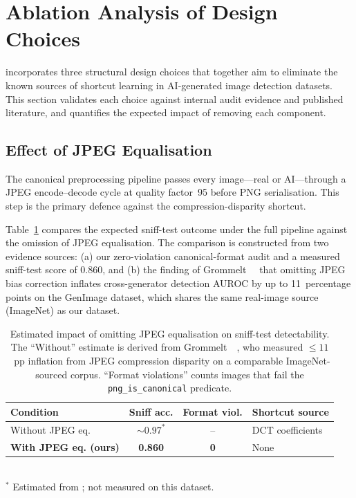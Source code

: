 
\section{Ablation Analysis of Design Choices}
\label{sec:ablation}

\textbf{\datasetname} incorporates three structural design choices
that together aim to eliminate the known sources of shortcut learning
in AI-generated image detection datasets.
This section validates each choice against internal audit evidence
and published literature, and quantifies the expected impact of
removing each component.

\subsection{Effect of JPEG Equalisation}
\label{ssec:abl_jpeg}

The canonical preprocessing pipeline passes every image---real or
AI---through a JPEG encode--decode cycle at quality factor~95 before
PNG serialisation.
This step is the primary defence against the compression-disparity
shortcut.

Table~\ref{tab:ablation_jpeg} compares the expected sniff-test
outcome under the full pipeline against the omission of JPEG
equalisation.
The comparison is constructed from two evidence sources:
(a) our zero-violation canonical-format audit and a measured
sniff-test score of 0.860, and (b) the finding of Grommelt~\etal\
\cite{grommelt2024jpeg} that omitting JPEG bias correction inflates
cross-generator detection AUROC by up to 11~percentage points on the
GenImage dataset, which shares the same real-image source
(ImageNet) as our dataset.

\begin{table}[t]
\centering
\caption{Estimated impact of omitting JPEG equalisation on
sniff-test detectability.
The ``Without'' estimate is derived from Grommelt~\etal\
\cite{grommelt2024jpeg}, who measured $\leq\!11$~pp inflation
from JPEG compression disparity on a comparable ImageNet-sourced
corpus.
``Format violations'' counts images that fail the
\texttt{png\_is\_canonical} predicate.}
\label{tab:ablation_jpeg}
\footnotesize
\setlength{\tabcolsep}{4pt}
\begin{tabular}{@{}>{\raggedright\arraybackslash}p{2.0cm}cc>{\raggedright\arraybackslash}p{1.7cm}@{}}
\toprule
Condition & Sniff acc. & Format viol. & Shortcut source \\
\midrule
Without JPEG eq. & ${\sim}0.97^{*}$ & -- & DCT coefficients \\
\textbf{With JPEG eq. (ours)} & \textbf{0.860} & \textbf{0} & None \\
\bottomrule
\end{tabular}
\\[2pt]
{\footnotesize $^{*}$ Estimated from \cite{grommelt2024jpeg}; not measured on this dataset.}
\end{table}


